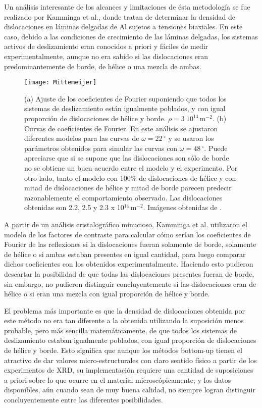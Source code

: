 Un análisis interesante de los alcances y limitaciones de ésta metodología se fue realizado por Kamminga et al.\cite{mittemeijer2003diffraction}, donde tratan de determinar la densidad de dislocaciones en láminas delgadas de Al sujetos a tensiones biaxiales.
En este caso, debido a las condiciones de crecimiento de las láminas delgadas, los sistemas activos de deslizamiento eran conocidos a priori y fáciles de medir experimentalmente, aunque no era sabido si las dislocaciones eran predominantemente de borde, de hélice o una mezcla de ambas.

\begin{figure}[!htb]
  \centering
  \texttt{[image: Mittemeijer]}
  \caption{(a) Ajuste de los coeficientes de Fourier suponiendo que todos los sistemas de deslizamiento están igualmente poblados, y con igual proporción de dislocaciones de hélice y borde. $\rho = 3 \ 10^{14}$\,m$^{-2}$. (b) Curvas de coeficientes de Fourier. En este análisis se ajustaron diferentes modelos para las curvas de $\omega = 22\,^{\circ}$ y se usaron los parámetros obtenidos para simular las curvas con $\omega = 48\,^{\circ}$. Puede apreciarse que si se supone que las dislocaciones son sólo de borde no se obtiene un buen acuerdo entre el modelo y el experimento. Por otro lado, tanto el modelo con 100\% de dislocaciones de hélice y con mitad de dislocaciones de hélice y mitad de borde parecen predecir razonablemente el comportamiento observado. Las dislocaciones obtenidas son 2.2, 2.5 y 2.3 x 10$^{14}$\,m$^{-2}$. Imágenes obtenidas de \cite{mittemeijer2003diffraction}.}
  \label{fig:FourierMittemeijer}
\end{figure}

A partir de un análisis cristalográfico minucioso, Kamminga et al. utilizaron el modelo de los factores de contraste para calcular cómo serían los coeficientes de Fourier de las reflexiones si la dislocaciones fueran solamente de borde, solamente de hélice o si ambas estaban presentes en igual cantidad, para luego comparar dichos coeficientes con los obtenidos experimentalmente.
Haciendo esto pudieron descartar la posibilidad de que todas las dislocaciones presentes fueran de borde, sin embargo, no pudieron distinguir concluyentemente si las dislocaciones eran de hélice o si eran una mezcla con igual proporción de hélice y borde.

El problema más importante es que la densidad de dislocaciones obtenida por este método no era tan diferente a la obtenida utilizando la suposición menos probable, pero más sencilla matemáticamente, de que todos los sistemas de deslizamiento estaban igualmente poblados, con igual proporción de dislocaciones de hélice y borde.
Esto significa que aunque los métodos bottom-up tienen el atractivo de dar valores micro-estructurales con claro sentido físico a partir de los experimentos de XRD, su implementación requiere una cantidad de suposiciones a priori sobre lo que ocurre en el material microscópicamente; y los datos disponibles, aún cuando sean de muy buena calidad, no siempre logran distinguir concluyentemente entre las diferentes posibilidades.

